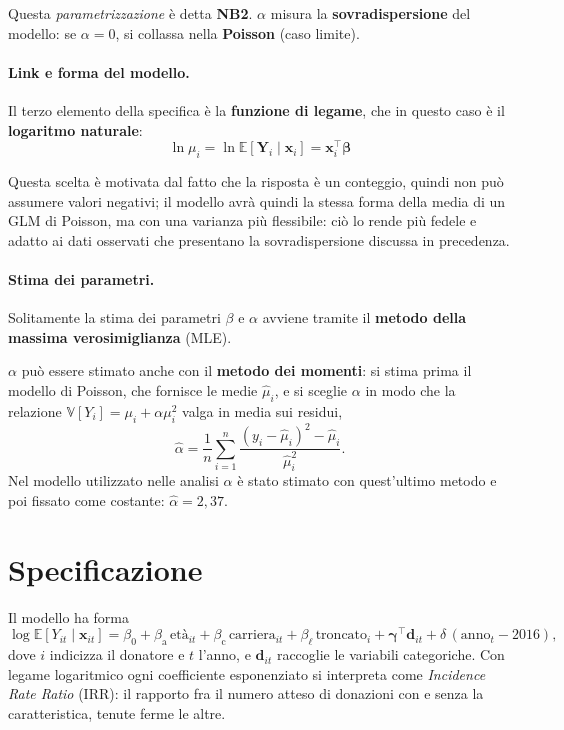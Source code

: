 Questa \textit{parametrizzazione} è detta \textbf{NB2}. $\alpha$ misura la \textbf{sovradispersione} del modello:
se $\alpha=0$, si collassa nella \textbf{Poisson} (caso limite).

\paragraph{Link e forma del modello.} Il terzo elemento della specifica è la
\textbf{funzione di legame}, che in questo caso è il \textbf{logaritmo naturale}:
\begin{equation}
    \ln\mu_i = \ln\mathbb{E}[\mathbf{Y}_i \mid \mathbf{x}_i] = \mathbf{x}_{i}^\top\boldsymbol{\beta}
\end{equation}

Questa scelta è motivata dal fatto che la risposta è un conteggio, quindi non può assumere valori negativi;
il modello avrà quindi la stessa forma della media di un GLM di Poisson, ma con una varianza più flessibile: 
ciò lo rende più fedele e adatto ai dati osservati che presentano la sovradispersione discussa in precedenza.

\paragraph{Stima dei parametri.}
Solitamente la stima dei parametri $\beta$ e $\alpha$ avviene tramite il 
\textbf{metodo della massima verosimiglianza} (MLE).

$\alpha$ può essere stimato anche con il \textbf{metodo dei momenti}: si stima
prima il modello di Poisson, che fornisce le medie $\hat{\mu}_i$, e si sceglie
$\alpha$ in modo che la relazione $\mathbb{V}[Y_i] = \mu_i + \alpha\mu_i^2$ valga
in media sui residui,
\begin{equation}
    \hat{\alpha} = \frac{1}{n}\sum_{i=1}^{n}
    \frac{(y_i - \hat{\mu}_i)^2 - \hat{\mu}_i}{\hat{\mu}_i^2}.
\end{equation}
Nel modello utilizzato nelle analisi $\alpha$ è stato stimato con quest'ultimo
metodo e poi fissato come costante: $\hat{\alpha} = 2{,}37$.

\section{Specificazione}
\label{sec:glm_spec}

Il modello ha forma
\begin{equation}
    \log \mathbb{E}[Y_{it} \mid \mathbf{x}_{it}]
    = \beta_0
    + \beta_{\text{a}}\,\text{età}_{it}
    + \beta_{\text{c}}\,\text{carriera}_{it}
    + \beta_{\ell}\,\text{troncato}_{i}
    + \boldsymbol{\gamma}^\top \mathbf{d}_{it}
    + \delta\,(\text{anno}_t - 2016),
    \label{eq:glm_form}
\end{equation}
dove $i$ indicizza il donatore e $t$ l'anno, e $\mathbf{d}_{it}$ raccoglie le
variabili categoriche. Con legame logaritmico ogni coefficiente esponenziato si
interpreta come \emph{Incidence Rate Ratio} (IRR): il rapporto fra il numero
atteso di donazioni con e senza la caratteristica, tenute ferme le altre.

